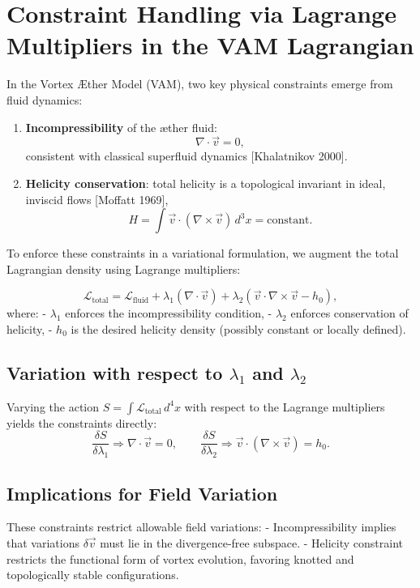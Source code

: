 \documentclass[12pt]{article}
\begin{document}
\section{Constraint Handling via Lagrange Multipliers in the VAM Lagrangian}

In the Vortex Æther Model (VAM), two key physical constraints emerge from fluid dynamics:

\begin{enumerate}
    \item \textbf{Incompressibility} of the æther fluid:
    \[
        \nabla \cdot \vec{v} = 0,
    \]
    consistent with classical superfluid dynamics [Khalatnikov 2000].

    \item \textbf{Helicity conservation}: total helicity is a topological invariant in ideal, inviscid flows [Moffatt 1969],
    \[
        H = \int \vec{v} \cdot (\nabla \times \vec{v})\, d^3x = \text{constant}.
    \]
\end{enumerate}

To enforce these constraints in a variational formulation, we augment the total Lagrangian density using Lagrange multipliers:

\[
    \mathcal{L}_{\text{total}} = \mathcal{L}_{\text{fluid}} + \lambda_1 (\nabla \cdot \vec{v}) + \lambda_2 (\vec{v} \cdot \nabla \times \vec{v} - h_0),
\]
where:
- \( \lambda_1 \) enforces the incompressibility condition,
- \( \lambda_2 \) enforces conservation of helicity,
- \( h_0 \) is the desired helicity density (possibly constant or locally defined).

\subsection*{Variation with respect to $\lambda_1$ and $\lambda_2$}

Varying the action \( S = \int \mathcal{L}_{\text{total}}\, d^4x \) with respect to the Lagrange multipliers yields the constraints directly:
\[
    \frac{\delta S}{\delta \lambda_1} \Rightarrow \nabla \cdot \vec{v} = 0,
    \qquad
    \frac{\delta S}{\delta \lambda_2} \Rightarrow \vec{v} \cdot (\nabla \times \vec{v}) = h_0.
\]

\subsection*{Implications for Field Variation}

These constraints restrict allowable field variations:
- Incompressibility implies that variations \( \delta \vec{v} \) must lie in the divergence-free subspace.
- Helicity constraint restricts the functional form of vortex evolution, favoring knotted and topologically stable configurations.
\end{document}
